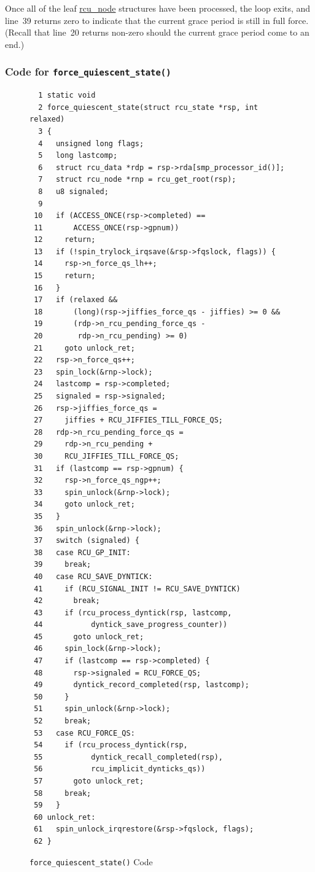Once all of the leaf \url{rcu_node} structures have been processed,
the loop exits, and line~39 returns zero to indicate that the current
grace period is still in full force.
(Recall that line~20 returns non-zero should the current grace period
come to an end.)

\subsubsection{Code for {\tt force\_quiescent\_state()}}
\label{app:rcuimpl:rcutreewt:Code for force-quiescent-state}

\begin{figure}[tbp]
{ \scriptsize
\begin{verbatim}
  1 static void
  2 force_quiescent_state(struct rcu_state *rsp, int relaxed)
  3 {
  4   unsigned long flags;
  5   long lastcomp;
  6   struct rcu_data *rdp = rsp->rda[smp_processor_id()];
  7   struct rcu_node *rnp = rcu_get_root(rsp);
  8   u8 signaled;
  9
 10   if (ACCESS_ONCE(rsp->completed) ==
 11       ACCESS_ONCE(rsp->gpnum))
 12     return;
 13   if (!spin_trylock_irqsave(&rsp->fqslock, flags)) {
 14     rsp->n_force_qs_lh++;
 15     return;
 16   }
 17   if (relaxed &&
 18       (long)(rsp->jiffies_force_qs - jiffies) >= 0 &&
 19       (rdp->n_rcu_pending_force_qs -
 20        rdp->n_rcu_pending) >= 0)
 21     goto unlock_ret;
 22   rsp->n_force_qs++;
 23   spin_lock(&rnp->lock);
 24   lastcomp = rsp->completed;
 25   signaled = rsp->signaled;
 26   rsp->jiffies_force_qs =
 27     jiffies + RCU_JIFFIES_TILL_FORCE_QS;
 28   rdp->n_rcu_pending_force_qs =
 29     rdp->n_rcu_pending +
 30     RCU_JIFFIES_TILL_FORCE_QS;
 31   if (lastcomp == rsp->gpnum) {
 32     rsp->n_force_qs_ngp++;
 33     spin_unlock(&rnp->lock);
 34     goto unlock_ret;
 35   }
 36   spin_unlock(&rnp->lock);
 37   switch (signaled) {
 38   case RCU_GP_INIT:
 39     break;
 40   case RCU_SAVE_DYNTICK:
 41     if (RCU_SIGNAL_INIT != RCU_SAVE_DYNTICK)
 42       break;
 43     if (rcu_process_dyntick(rsp, lastcomp,
 44           dyntick_save_progress_counter))
 45       goto unlock_ret;
 46     spin_lock(&rnp->lock);
 47     if (lastcomp == rsp->completed) {
 48       rsp->signaled = RCU_FORCE_QS;
 49       dyntick_record_completed(rsp, lastcomp);
 50     }
 51     spin_unlock(&rnp->lock);
 52     break;
 53   case RCU_FORCE_QS:
 54     if (rcu_process_dyntick(rsp,
 55           dyntick_recall_completed(rsp),
 56           rcu_implicit_dynticks_qs))
 57       goto unlock_ret;
 58     break;
 59   }
 60 unlock_ret:
 61   spin_unlock_irqrestore(&rsp->fqslock, flags);
 62 }
\end{verbatim}
}
\caption{{\tt force\_quiescent\_state()} Code}
\label{fig:app:rcuimpl:rcutreewt:Code for rcutree force-quiescent-state}
\end{figure}


